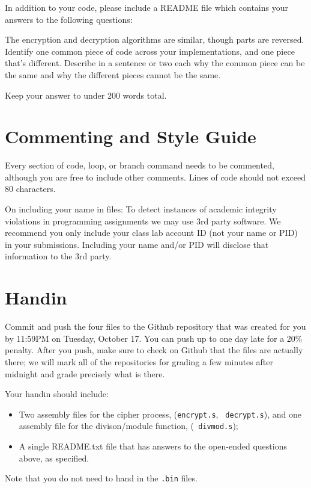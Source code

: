 \documentclass{article}
\begin{document}
In addition to your code, please include a README file which contains your
answers to the following questions:

The encryption and decryption algorithms are similar, though parts are
reversed. Identify one common piece of code across your implementations, and
one piece that's different. Describe in a sentence or two each why the common
piece can be the same and why the different pieces cannot be the same.

Keep your answer to under 200 words total.

\section{Commenting and Style Guide}

Every section of code, loop, or branch command needs to be commented, although
you are free to include other comments. Lines of code should not exceed 80
characters.

On including your name in files: To detect instances of academic integrity
violations in programming assignments we may use 3rd party software.  We
recommend you only include your class lab account ID (not your name or PID) in
your submissions.  Including your name and/or PID will disclose that
information to the 3rd party.

\section{Handin}

Commit and push the four files to the Github repository that was created
for you by 11:59PM on Tuesday, October 17. You can push up to one day late for
a 20\% penalty. After you push, make sure to check on Github that the files are
actually there; we will mark all of the repositories for grading a few minutes
after midnight and grade precisely what is there.

Your handin should include:

\begin{itemize}
\item Two assembly files for the cipher process, ({\tt encrypt.s}, {\tt 
decrypt.s}), and one assembly file for the divison/module function, ({\tt 
divmod.s}); 
\item A single README.txt file that has answers to the open-ended questions
above, as specified.
\end{itemize}

Note that you do not need to hand in the {\tt .bin} files.
\end{document}
